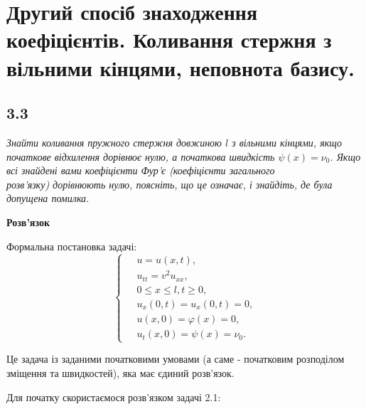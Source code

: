 \documentclass[a4paper, 14pt]{extreport}
\begin{document}
\setcounter{chapter}{2}

\chapter{Другий спосіб знаходження коефіцієнтів. Коливання стержня з вільними кінцями, неповнота базису.}

\section[Задача №3.3]{3.3}

\textit{Знайти коливання пружного стержня довжиною $l$ з вільними кінцями, якщо початкове відхилення дорівнює нулю, а початкова швидкість $\psi(x) = \nu_0$. Якщо всі знайдені вами коефіцієнти Фур'є (коефіцієнти загального\\ розв’язку) дорівнюють нулю, поясніть, що це означає, і знайдіть, де була допущена помилка.}

\begin{center}
    \textbf{Розв'язок}
\end{center}
Формальна постановка задачі:
\begin{equation} \label{probcond5}
    \left\{ \begin{aligned} %
        &\;u = u(x,t), \\
        &\;u_{tt} = v^2 u_{xx}, \\
        &\;0 \leq x \leq l, t \geq 0, \\
        &\;u_x(0,t) = u_x(0,t) = 0,\\
        &\;u(x,0) = \varphi(x) = 0, \\ 
        &\;u_t(x,0) = \psi(x) = \nu_0.
    \end{aligned} \right.
\end{equation}

Це задача із заданими початковими умовами (а саме - початковим розподілом зміщення та швидкостей), яка має єдиний розв'язок.

Для початку скористаємося розв'язком задачі 2.1:
\end{document}
